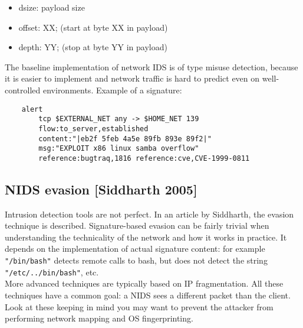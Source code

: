 \documentclass[a4paper, 10pt, titlepage]{article}
\begin{document}
\begin{itemize}
	\item dsize: payload size
	\item offset: XX; (start at byte XX in payload)
	\item depth: YY; (stop at byte YY in payload)
\end{itemize}
The baseline implementation of network IDS is of type misuse detection, because it is easier to implement and network traffic is hard to predict even on well-controlled environments. Example of a signature:
\begin{lstlisting}
	alert
		tcp $EXTERNAL_NET any -> $HOME_NET 139
		flow:to_server,established
		content:"|eb2f 5feb 4a5e 89fb 893e 89f2|"
		msg:"EXPLOIT x86 linux samba overflow"
		reference:bugtraq,1816 reference:cve,CVE-1999-0811
\end{lstlisting}
 	
\subsection{NIDS evasion [Siddharth 2005]}
Intrusion detection tools are not perfect. In an article by Siddharth, the evasion technique is described.
Signature-based evasion can be fairly trivial when understanding the technicality of the network and how it works in practice. It depends on the implementation of actual signature content: for example \lstinline|"/bin/bash"| detects remote calls to bash, but does not detect the string \lstinline|"/etc/../bin/bash"|, etc.\\
More advanced techniques are typically based on IP fragmentation. All these techniques have a common goal: a NIDS sees a different packet than the client.
Look at these keeping in mind you may want to prevent the attacker from performing network mapping and OS fingerprinting.

\end{document}
